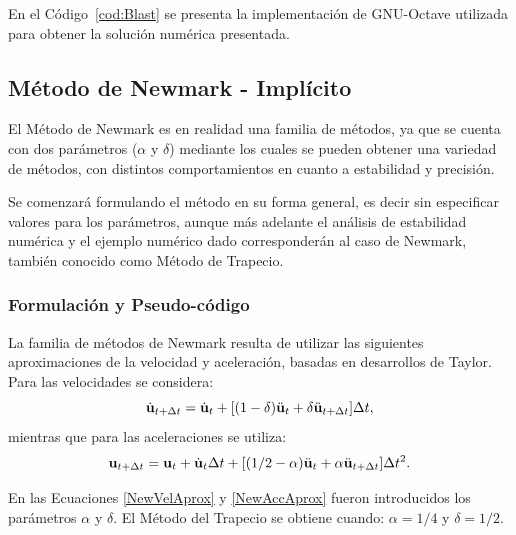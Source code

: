 En el Código~\ref{cod:Blast} se presenta la implementación de GNU-Octave utilizada para obtener la solución numérica presentada.



\subsection{Método de Newmark - Implícito}
El Método de Newmark es en realidad una familia de métodos, ya que se cuenta con dos parámetros ($\alpha$ y $\delta$) mediante los cuales se pueden obtener una variedad de métodos, con distintos comportamientos en cuanto a estabilidad y precisión.

Se comenzará formulando el método en su forma general, es decir sin especificar valores para los parámetros, aunque más adelante el análisis de estabilidad numérica y el ejemplo numérico dado corresponderán al caso de Newmark, también conocido como Método de Trapecio.

\subsubsection{Formulación y Pseudo-código} \label{FormNewmarkLin}
La familia de métodos de Newmark resulta de utilizar las siguientes aproximaciones de la velocidad y aceleración, basadas en desarrollos de Taylor. Para las velocidades se considera:
%
\begin{equation}\label{NewVelAprox}
	\dot{{\bf u}}_{t+\Delta t} = \dot{{\bf u}}_t + [(1-\delta)\ddot{{\bf u}}_t + \delta\ddot{{\bf u}}_{t+\Delta t}]\Delta t,
\end{equation}
mientras que para las aceleraciones se utiliza:
\begin{equation}\label{NewAccAprox}
{\bf u}_{t+\Delta t} = {\bf u}_t + \dot{{\bf u}}_t\Delta t + [(1/2-\alpha)\ddot{{\bf u}}_t + \alpha\ddot{{\bf u}}_{t+\Delta t}]\Delta t^2.
\end{equation}

En las Ecuaciones \eqref{NewVelAprox} y \eqref{NewAccAprox} fueron introducidos los parámetros $\alpha$ y $\delta$. %
%
El Método del Trapecio se obtiene cuando: $\alpha = 1/4$ y $\delta = 1/2$.

